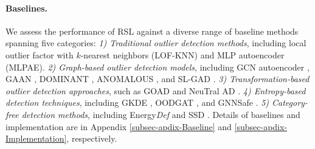 \paragraph{Baselines.}  
We assess the performance of RSL against a diverse range of baseline methods spanning five categories:  \textit{1) Traditional outlier detection methods}, including local outlier factor \citep{breunig2000lof} with $k$-nearest neighbors (LOF-KNN) and MLP autoencoder (MLPAE). \textit{2) Graph-based outlier detection models}, including GCN autoencoder \citep{kipf2016variational}, GAAN  \citep{chen2020generative}, DOMINANT \citep{ding2019deep}, ANOMALOUS  \citep{peng2018anomalous}, and SL-GAD \citep{zheng2021generative}. \textit{3) Transformation-based outlier detection approaches}, such as GOAD \citep{bergman2020classification} and NeuTral AD  \citep{qiu2021neural}. \textit{4) Entropy-based detection techniques}, including GKDE \citep{zhao2020uncertainty}, OODGAT  \citep{song2022learning}, and GNNSafe \citep{wu2023energy}.  \textit{5) Category-free detection methods}, including Energy\textit{Def} \citep{gong2024energy} and SSD \citep{sehwag2021ssd}. 
Details of baselines and implementation are in Appendix \ref{subsec-apdix-Baseline} and \ref{subsec-apdix-Implementation}, respectively.






